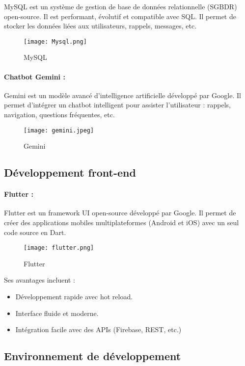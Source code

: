 \documentclass[12pt,a4paper]{report}
\begin{document}
MySQL est un système de gestion de base de données relationnelle (SGBDR) open-source. Il est performant, évolutif et compatible avec SQL. Il permet de stocker les données liées aux utilisateurs, rappels, messages, etc.
\begin{figure}[H] 
    \centering
    \texttt{[image: Mysql.png]}
    \caption{MySQL}
    \label{fig:mysql}
\end{figure}

\paragraph{Chatbot Gemini :}

Gemini est un modèle avancé d'intelligence artificielle développé par Google. Il permet d’intégrer un chatbot intelligent pour assister l’utilisateur : rappels, navigation, questions fréquentes, etc.
\begin{figure}[H] 
    \centering
    \texttt{[image: gemini.jpeg]}
    \caption{Gemini}
    \label{fig:gemini}
\end{figure}
\subsection{Développement front-end}

\paragraph{Flutter :}

Flutter est un framework UI open-source développé par Google. Il permet de créer des applications mobiles multiplateformes (Android et iOS) avec un seul code source en Dart.
\begin{figure}[H] 
    \centering
    \texttt{[image: flutter.png]}
    \caption{Flutter}
    \label{fig:flutter}
\end{figure}

Ses avantages incluent :
\begin{itemize}
    \item Développement rapide avec hot reload.
    \item Interface fluide et moderne.
    \item Intégration facile avec des APIs (Firebase, REST, etc.)
\end{itemize}
\subsection{ Environnement de développement}
\end{document}
